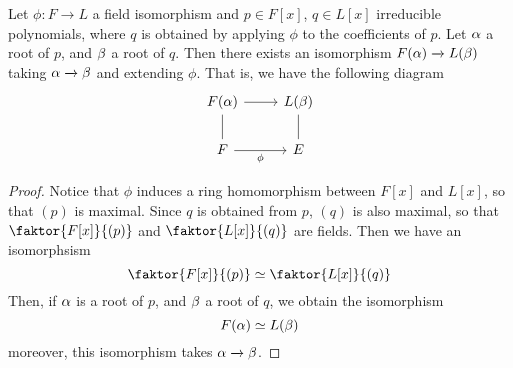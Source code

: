 \begin{theorem}\label{theorem_8.1.9}
  Let $\phi:F \xrightarrow{} L$ a field isomorphism and $p \in F[x]$, $q \in
  L[x]$ irreducible polynomials, where $q$ is obtained by applying  $\phi$ to
  the coefficients of $p$. Let  $\alpha$ a root of  $p$, and  $\beta$ a root of $q$.
  Then there exists an isomorphism $F(\alpha) \xrightarrow{} L(\beta)$ taking $\alpha
  \xrightarrow{} \beta$ and extending $\phi$. That is, we have the following
  diagram
  \[\begin{tikzcd}
    {F(\alpha)} & {L(\beta)} \\
    F & E
    \arrow[no head, from=1-1, to=2-1]
    \arrow[no head, from=1-2, to=2-2]
    \arrow[from=1-1, to=1-2]
    \arrow["\phi"', from=2-1, to=2-2]
  \end{tikzcd}\]
\end{theorem}
\begin{proof}
  Notice that $\phi$ induces a ring homomorphism between  $F[x]$ and $L[x]$,
  so that $(p)$ is maximal. Since $q$ is obtained from $p$,  $(q)$ is also
  maximal, so that $\faktor{F[x]}{(p)}$ and $\faktor{L[x]}{(q)}$ are fields.
  Then we have an isomorphsism
  \begin{equation*}
    \faktor{F[x]}{(p)} \simeq \faktor{L[x]}{(q)}
  \end{equation*}
  Then, if $\alpha$ is a root of $p$, and $\beta$ a root of $q$, we obtain the
  isomorphism
  \begin{equation*}
    F(\alpha) \simeq L(\beta)
  \end{equation*}
  moreover, this isomorphism takes $\alpha \xrightarrow{} \beta$.
\end{proof}
